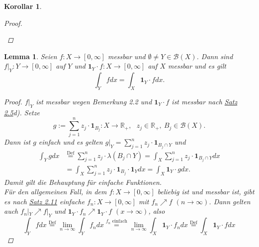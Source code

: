 \documentclass[a4paper]{report}
\newcommand{\doubleOne}{\textbf{1}}
\newcommand{\R}{\mathbb{R}}
\newcommand{\Borel}{\mathcal{B}}
\newcommand{\toInf}{\rightarrow \infty}
\newcommand{\limToInf}[1]{\lim_{#1 \toInf}}
\newcommand{\jlabel}[1]{\label{j_#1}}
\newcommand{\jhyperref}[2]{\hyperref[j_#1]{#2}}
\newcommand{\jlink}[1]{\jhyperref{#1}{#1}}
\newcommand{\jabb}[3]{ #1: #2 \rightarrow #3 }
\theoremstyle{plain}
\newtheorem{lem}[thm]{Lemma}
\newtheorem{kor}[thm]{Korollar}
\theoremstyle{definition}
\begin{document}
{{{\begin{kor}
\begin{proof}
\begin{enumerate}
        \end{enumerate}
    \end{proof}
\end{kor}

\begin{lem}
\jlabel{Lem 2.21}
    Seien $\jabb{f}{X}{[0,\infty]}$ messbar und $\emptyset \ne Y \in \Borel(X)$. Dann sind $\jabb{f|_Y}{Y}{[0,\infty]}$ auf $Y$ und $\jabb{\doubleOne_{Y}\cdot f}{X}{[0,\infty]}$ auf $X$ messbar und es gilt
    \begin{displaymath}
        \int_Y f dx = \int_X \doubleOne_Y\cdot f dx.
    \end{displaymath}
    \begin{proof}
        $f|_Y$ ist messbar wegen Bemerkung 2.2 und $\doubleOne_Y\cdot f$ ist messbar nach \jlink{Satz 2.5}d). Setze
        \begin{displaymath}
            g:= \jabb{\sum_{j=1}^n z_j \cdot \doubleOne_{B_j}}{X}{\R_+}, \ \ \ z_j\in \R_+,\ B_j \in \Borel(X).
        \end{displaymath}
        Dann ist $g$ einfach und es gelten $g|_Y = \sum_{j=1}^n z_j\cdot \doubleOne_{B_j \cap Y}$ und
        \begin{displaymath}
            \begin{split}
                \int_Y g dx &\overset{\text{Def}}{=} \sum_{j=1}^n z_j \cdot\lambda(B_j\cap Y) = \int_X \sum_{j=1}^n z_j \cdot \doubleOne_{B_j \cap Y} dx\\
                &= \int_X \sum_{j=1}^n z_j \cdot \doubleOne_{B_j}\cdot \doubleOne_Y dx = \int_X \doubleOne_Y \cdot g dx.
            \end{split}
        \end{displaymath}
        Damit gilt die Behauptung für einfache Funktionen.\\
        Für den allgemeinen Fall, in dem $\jabb{f}{X}{[0,\infty]}$ beliebig ist und messbar ist, gibt es nach \jlink{Satz 2.11} einfache $\jabb{f_n}{X}{[0,\infty]}$ mit $f_n \nearrow f$ $(n\rightarrow \infty)$. Dann gelten auch $f_n|_Y \nearrow f|_Y$ und $\doubleOne_Y \cdot f_n \nearrow \doubleOne_Y \cdot f$ $(x \rightarrow \infty)$, also
        \begin{displaymath}
            \int_Yf dx \overset{\text{Def}}{=} \limToInf{n} \int_Y f_n dx \overset{\text{$f_n$ einfach}}{=} \limToInf{n} \int_X \doubleOne_Y\cdot f_n dx \overset{\text{Def}}{=} \int_X \doubleOne_Y \cdot f dx
        \end{displaymath}
    \end{proof}
\end{lem}


}}}
\end{document}
